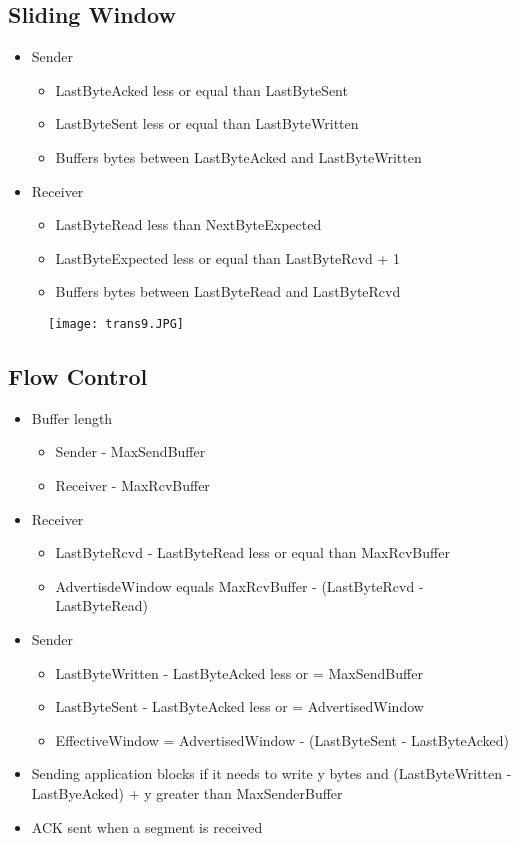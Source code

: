 \documentclass[../resumosRCOM.tex]{subfiles}
\begin{document}
\subsection{Sliding Window}
\begin{itemize}
    \item Sender
    \begin{itemize}
        \item LastByteAcked less or equal than LastByteSent
        \item LastByteSent less or equal than LastByteWritten
        \item Buffers bytes between LastByteAcked and LastByteWritten
    \end{itemize}
    \item Receiver
    \begin{itemize}
        \item LastByteRead less than NextByteExpected
        \item LastByteExpected less or equal than LastByteRcvd + 1
        \item Buffers bytes between LastByteRead and LastByteRcvd
    \end{itemize}
\end{itemize}
\begin{figure}[h]
    \centering
    \texttt{[image: trans9.JPG]}
\end{figure}

\subsection{Flow Control}
\begin{itemize}
    \item Buffer length
    \begin{itemize}
        \item Sender - MaxSendBuffer
        \item Receiver - MaxRcvBuffer
    \end{itemize}
    \item Receiver
    \begin{itemize}
        \item LastByteRcvd - LastByteRead less or equal than MaxRcvBuffer
        \item AdvertisdeWindow equals MaxRcvBuffer - (LastByteRcvd - LastByteRead) 
    \end{itemize}
    \item Sender
    \begin{itemize}
        \item LastByteWritten - LastByteAcked less or = MaxSendBuffer
        \item LastByteSent - LastByteAcked less or = AdvertisedWindow
        \item EffectiveWindow = AdvertisedWindow - (LastByteSent - LastByteAcked)
    \end{itemize}
    \item Sending application blocks if it needs to write y bytes and (LastByteWritten - LastByeAcked) + y greater than MaxSenderBuffer
    \item ACK sent when a segment is received
\end{itemize}
\end{document}
